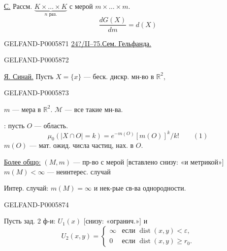 \underline{С.} Рассм.
\(\displaystyle\underbrace{K\times\ldots\times K}_{n\text{ раз.}}\)
с мерой \(m\times\ldots\times m\).
\[
\frac{dG(X)}{dm}=d(X)
\]
\par\noindent\hfill
\makebox[.72\linewidth]{\leaders\hbox{\kern.55em\rule{.23em}{.4pt}\kern.55em}\hfill}
\hfill\mbox{}\par


\begin{GelfandAdjacentEvidence}{GELFAND-P000587}{1}
\underline{24?/II--75.}\qquad \underline{Сем. Гельфанда.}
\end{GelfandAdjacentEvidence}
\begin{GelfandAdjacentEvidence}{GELFAND-P000587}{2}


\underline{Я. Синай.} Пусть \(X=\{x\}\) — беск. дискр. мн-во в \(\mathbb R^2\),
\end{GelfandAdjacentEvidence}
\begin{GelfandAdjacentEvidence}{GELFAND-P000587}{3}

\(m\) — мера в \(\mathbb R^2\).
\(\mathcal M\) — все такие мн-ва.

: пусть \(O\) — область.
\[
\mu_0(\lvert X\cap O\rvert=k)=e^{-m(O)}[m(O)]^k/k!\qquad (1)
\]
\(m(O)\) — мат. ожид. числа частиц, нах. в \(O\).

\underline{Более общо:} \((M,m)\) — пр-во с мерой [вставлено снизу: «и метрикой»]
\(m(M)<\infty\) — неинтерес. случай

Интер. случай: \(m(M)=\infty\) и нек-рые св-ва однородности.
\end{GelfandAdjacentEvidence}
\begin{GelfandAdjacentEvidence}{GELFAND-P000587}{4}


Пусть зад. 2 ф-и: \(U_1(x)\) [снизу: «огранич.»] и
\[
U_2(x,y)=
\begin{cases}
\infty & \text{если }\operatorname{dist}(x,y)<\varepsilon,\\
0 & \text{если }\operatorname{dist}(x,y)\ge r_0.
\end{cases}
\]
\end{GelfandAdjacentEvidence}
